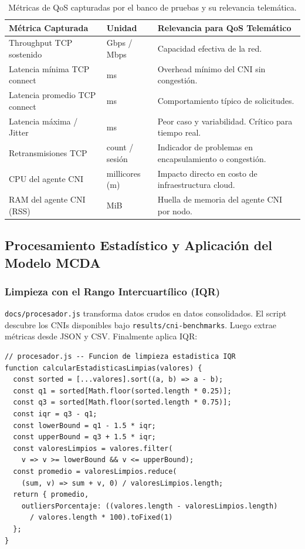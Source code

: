 \begin{table}[htbp]
\centering
\scriptsize
\renewcommand{\arraystretch}{1.25}
\setlength{\tabcolsep}{4pt}
\caption{Métricas de QoS capturadas por el banco de pruebas y su relevancia telemática.}
\label{tab:metricas-qos-implementacion}
\begin{tabularx}{\textwidth}{|p{4cm}|p{2.4cm}|Y|}
\hline
\textbf{Métrica Capturada} & \textbf{Unidad} & \textbf{Relevancia para QoS Telemático} \\
\hline
Throughput TCP sostenido & Gbps / Mbps & Capacidad efectiva de la red. \\
\hline
Latencia mínima TCP connect & ms & Overhead mínimo del CNI sin congestión. \\
\hline
Latencia promedio TCP connect & ms & Comportamiento típico de solicitudes. \\
\hline
Latencia máxima / Jitter & ms & Peor caso y variabilidad. Crítico para tiempo real. \\
\hline
Retransmisiones TCP & count / sesión & Indicador de problemas en encapsulamiento o congestión. \\
\hline
CPU del agente CNI & millicores (m) & Impacto directo en costo de infraestructura cloud. \\
\hline
RAM del agente CNI (RSS) & MiB & Huella de memoria del agente CNI por nodo. \\
\hline
\end{tabularx}
\end{table}

\subsection{Procesamiento Estadístico y Aplicación del Modelo MCDA}

\subsubsection{Limpieza con el Rango Intercuartílico (IQR)}

\texttt{docs/procesador.js} transforma datos crudos en datos consolidados. El script descubre los CNIs disponibles bajo \texttt{results/cni-benchmarks}. Luego extrae métricas desde JSON y CSV. Finalmente aplica IQR:

\begin{lstlisting}
// procesador.js -- Funcion de limpieza estadistica IQR
function calcularEstadisticasLimpias(valores) {
  const sorted = [...valores].sort((a, b) => a - b);
  const q1 = sorted[Math.floor(sorted.length * 0.25)];
  const q3 = sorted[Math.floor(sorted.length * 0.75)];
  const iqr = q3 - q1;
  const lowerBound = q1 - 1.5 * iqr;
  const upperBound = q3 + 1.5 * iqr;
  const valoresLimpios = valores.filter(
    v => v >= lowerBound && v <= upperBound);
  const promedio = valoresLimpios.reduce(
    (sum, v) => sum + v, 0) / valoresLimpios.length;
  return { promedio,
    outliersPorcentaje: ((valores.length - valoresLimpios.length)
      / valores.length * 100).toFixed(1)
  };
}
\end{lstlisting}


